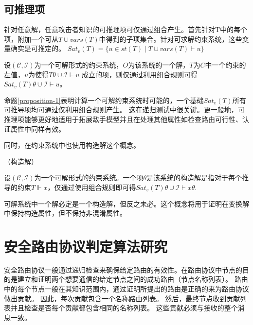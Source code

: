 \subsection{可推理项}
针对任意解，任意攻击者知识的可推理项可仅通过组合产生。首先针对T中的每个项，附加一个可从$T\cup vars(T)$中得到的子项集合。针对可求解约束系统，这些变量确实是可推定的。
$Sat_{v}(T)=\{u\in st(T)\mid T\cup vars(T)\vdash u\}$
\begin{proposition}
设$(\mathcal{C},\mathcal{I})$为一个可解形式的约束系统，$O$为该系统的一个解，$T$为$C$中一个约束的左值，$u$为使得$T\theta\cup\mathcal{I}\vdash u$
成立的项，则仅通过利用组合规则可得$Sat_{v}(T)\theta\cup\mathcal{I}\vdash u$。
\label{proposition-1}
\end{proposition}
命题\ref{proposition-1}表明计算一个可解约束系统时可能的，一个基础$Sat_{v}(T)$所有可推导项均可通过仅利用组合规则产生。
这在递归测试中很关键。更一般地，可推理项能够更好地适用于拓展敌手模型并且在处理其他属性如检查路由可行性、认证属性中同样有效。

同时，在约束系统中也使用构造解这个概念。

\begin{definition}{（构造解）}

设$(\mathcal{C},\mathcal{I})$为一个可解形式的约束系统。一个项$\theta$是该系统的构造解是指对于每个推导的约束$T\Vdash x$，仅通过使用组合规则即可得$Sat_{v}(T)\theta\cup\mathcal{I}\vdash x\theta$.
\end{definition}

可解系统中一个解必定是一个构造解，但反之未必。这个概念将用于证明在变换解中保持构造属性，但不保持非混淆属性。

\section{安全路由协议判定算法研究}
安全路由协议一般通过递归检查来确保给定路由的有效性。在路由协议中节点的目的是建立和证明两个想要通信的给定节点之间的成功路由（节点名称列表）。
路由中的每个节点一般在其知识范围内，通过证明所提出的路由是正确的来为路由协议做出贡献。
因此，每次贡献包含一个名称路由列表。
然后，最终节点收到贡献列表并且检查是否每个贡献都包含相同的名称列表。
这些贡献必须与接收的整个消息一致。


